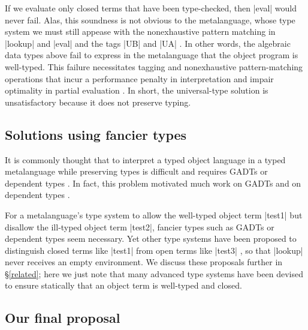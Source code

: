 \documentclass[preprint]{sigplanconf}
\begin{document}
If we evaluate only closed terms that have been type-checked, then
|eval| would never fail. Alas, this soundness is not obvious to the
metalanguage, whose type system we must still appease with the
nonexhaustive pattern matching in |lookup| and |eval| and the tags |UB|
and |UA| \citep[\S1.4]{WalidICFP02}.  In other words, the algebraic data
types above fail to express in the metalanguage that the object program
is well-typed.  This failure necessitates tagging and nonexhaustive
pattern\hyp matching operations that incur a performance penalty in
interpretation \citep{WalidICFP02} and impair optimality in partial evaluation
\citep{taha-tag}.  In short, the universal\hyp type solution is
unsatisfactory because it does not preserve typing.

\subsection{Solutions using fancier types}

It is commonly thought that to interpret a typed object language in
a typed metalanguage while preserving types is difficult and requires
GADTs or dependent types \citep{taha-tag}.  In fact, this problem
motivated much work on GADTs \citep{xi-guarded,peyton-jones-simple} and
on dependent types \citep{WalidICFP02,fogarty-concoqtion}.

For a metalanguage's type system to allow the well-typed object term
|test1| but disallow the ill-typed object term |test2|, fancier types
such as GADTs or dependent types seem necessary.  Yet other type systems
have been proposed to distinguish closed terms like |test1| from open
terms like |test3|
\citep{WalidPOPL03,NanevskiICFP02,NanevskiJFP05,DaviesJACM01,nanevski-contextual},
so that |lookup| never receives an empty environment.  We discuss these
proposals further in \S\ref{related}; here we just note that many
advanced type systems have been devised to ensure statically that an
object term is well-typed and closed.

\subsection{Our final proposal}\label{ourapproach}
\end{document}
